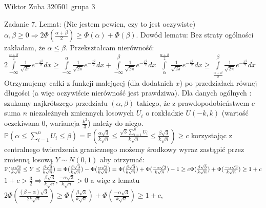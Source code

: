 \documentclass{article}
\begin{document}
Wiktor Zuba 320501 grupa 3
\newline

Zadanie 7.
\newline
\newline
Lemat: (Nie jestem pewien, czy to jest oczywiste)\newline
$\alpha,\beta\ge0\Rightarrow 2\Phi(\frac{\alpha+\beta}{2})\ge\Phi(\alpha)+\Phi(\beta)$.\newline
Dowód lematu: Bez straty ogólności zakładam, że $\alpha\le\beta$. Przekształcam nierówność:\newline
$2\int\limits_{-\infty}^{\frac{\alpha+\beta}{2}}\frac{1}{\sqrt{2\pi}}e^{-\frac{x^2}{2}}dx\ge
\int\limits_{-\infty}^{\alpha}\frac{1}{\sqrt{2\pi}}e^{-\frac{x^2}{2}}dx
+\int\limits_{-\infty}^{\beta}\frac{1}{\sqrt{2\pi}}e^{-\frac{x^2}{2}}dx$\newline
$
\int\limits_{\alpha}^{\frac{\alpha+\beta}{2}}\frac{1}{\sqrt{2\pi}}e^{-\frac{x^2}{2}}dx\ge
\int\limits_{\frac{\alpha+\beta}{2}}^{\beta}\frac{1}{\sqrt{2\pi}}e^{-\frac{x^2}{2}}dx$\newline
Otrzymujemy całki z funkcji malejącej (dla dodatnich $x$) po przedziałach równej długości (a więc oczywiście nierówność jest prawdziwa).\newline\newline
%
Dla danych ogólnych : szukamy najkrótszego przedziału $(\alpha,\beta)$ takiego, że z prawdopodobieństwem $c$ suma $n$ niezależnych zmiennych losowych $U_i$ o rozkładzie $U(-k,k)$
(wartość oczekiwana $0$, wariancja $\frac{k^2}{3}$) należy do niego.\newline
$\mathbb{P}(\alpha\le\sum_{i=1}^{n}U_i\le\beta)=\mathbb{P}\left(\frac{\alpha\sqrt{3}}{k\sqrt{n}}\le\frac{\sqrt{3}\sum\limits_{i=1}^{n}U_i}{k\sqrt{n}}\le\frac{\beta\sqrt{3}}{k\sqrt{n}}\right)\ge c$
korzystając z centralnego twierdzenia granicznego możemy środkowy wyraz zastąpić przez zmienną losową $Y\sim N(0,1)$ aby otrzymać:\newline
$\mathbb{P}(\frac{\alpha\sqrt{3}}{k\sqrt{n}}\le Y\le\frac{\beta\sqrt{3}}{k\sqrt{n}})=\Phi(\frac{\beta\sqrt{3}}{k\sqrt{n}})-\Phi(\frac{\alpha\sqrt{3}}{k\sqrt{n}})=
\Phi(\frac{\beta\sqrt{3}}{k\sqrt{n}})+\Phi(\frac{-\alpha\sqrt{3}}{k\sqrt{n}})-1\ge c\newline
\Phi(\frac{\beta\sqrt{3}}{k\sqrt{n}})+\Phi(\frac{-\alpha\sqrt{3}}{k\sqrt{n}})\ge 1+c$\newline
$1+c>\frac{3}{2}\Rightarrow \frac{\beta\sqrt{3}}{k\sqrt{n}},\frac{-\alpha\sqrt{3}}{k\sqrt{n}}>0$ a więc z lematu
$2\Phi(\frac{(\beta-\alpha)\sqrt{3}}{2k\sqrt{n}})\ge\Phi(\frac{\beta\sqrt{3}}{k\sqrt{n}})+\Phi(\frac{-\alpha\sqrt{3}}{k\sqrt{n}})\ge 1+c$,
\end{document}
